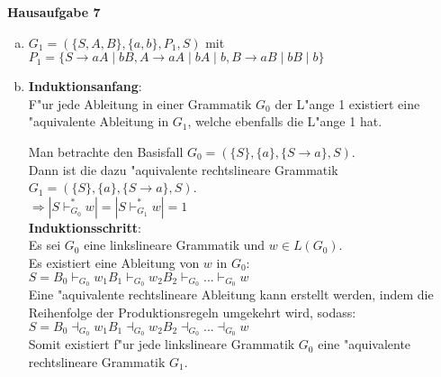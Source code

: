 \documentclass[a4paper,12pt]{article}
\newcommand{\Aufgabe}[1]{
        {
        \vspace*{0.5cm}
        \textbf{Hausaufgabe #1}
        \vspace*{0.2cm}
    }
}
\begin{document}
\Aufgabe{7} 

\begin{enumerate}[(a)]
    \item 
    $ G_1 = (\{S, A, B\}, \{a, b\}, P_1, S) $ mit \\
    $ P_1 = \{S \rightarrow aA \mid bB, A \rightarrow aA \mid bA \mid b, B \rightarrow aB \mid bB \mid b\} $

    \newpage

    \item
    \textbf{Induktionsanfang}: \\
    F"ur jede Ableitung in einer Grammatik $ G_0 $ der L"ange 1 existiert eine 
    "aquivalente Ableitung in $ G_1 $, welche ebenfalls die L"ange 1 hat.

    Man betrachte den Basisfall $ G_0 = (\{S\}, \{a\}, \{S \rightarrow a\}, S) $. \\
    Dann ist die dazu "aquivalente rechtslineare Grammatik $ G_1 = (\{S\}, \{a\}, \{S \rightarrow a\}, S) $. \\
    $ \Rightarrow |S \vdash^*_{G_0} w| = |S \vdash^*_{G_1} w| = 1 $ \\

    \textbf{Induktionsschritt}: \\
    Es sei $ G_0 $ eine linkslineare Grammatik und $ w \in L(G_0) $. \\
    Es existiert eine Ableitung von $ w $ in $ G_0 $: \\
    $ S = B_0 \vdash_{G_0} w_1 B_1 \vdash_{G_0} w_2 B_2 \vdash_{G_0} ... \vdash_{G_0} w $ \\

    Eine "aquivalente rechtslineare Ableitung kann erstellt werden, indem die Reihenfolge der Produktionsregeln
    umgekehrt wird, sodass: \\
    $ S = B_0 \dashv_{G_0} w_1 B_1 \dashv_{G_0} w_2 B_2 \dashv_{G_0} ... \dashv_{G_0} w $ \\

    Somit existiert f"ur jede linkslineare Grammatik $ G_0 $ eine "aquivalente rechtslineare Grammatik $ G_1 $. 
\end{enumerate}
\end{document}
